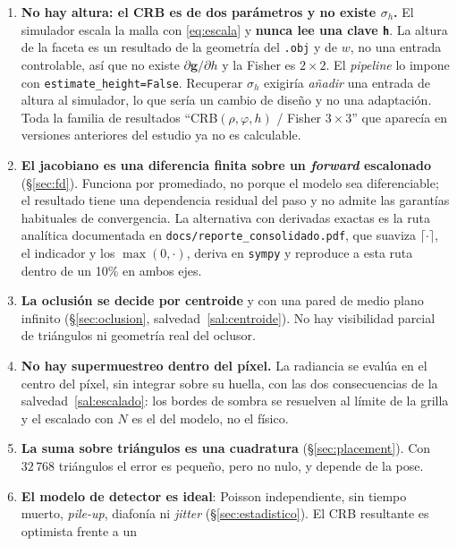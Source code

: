 \documentclass[11pt,a4paper]{article}
\newcommand{\vect}[1]{\boldsymbol{#1}}
\newcommand{\code}[1]{\texttt{#1}}
\theoremstyle{definition}
\theoremstyle{plain}
\begin{document}
\begin{enumerate}[leftmargin=*]
  \item \textbf{No hay altura: el CRB es de dos parámetros y no existe
        $\sigma_h$.} El simulador escala la malla con \eqref{eq:escala} y
        \textbf{nunca lee una clave \code{h}}. La altura de la faceta es un
        resultado de la geometría del \code{.obj} y de $w$, no una entrada
        controlable, así que no existe $\partial\vect g/\partial h$ y la Fisher
        es $2\times2$. El \emph{pipeline} lo impone con
        \code{estimate\_height=False}. Recuperar $\sigma_h$ exigiría
        \emph{añadir} una entrada de altura al simulador, lo que sería un cambio
        de diseño y no una adaptación. Toda la familia de resultados
        \enquote{CRB$(\rho,\varphi,h)$ / Fisher $3\times3$} que aparecía en
        versiones anteriores del estudio ya no es calculable.
  \item \textbf{El jacobiano es una diferencia finita sobre un \emph{forward}
        escalonado} (\S\ref{sec:fd}). Funciona por promediado, no porque el
        modelo sea diferenciable; el resultado tiene una dependencia residual
        del paso y no admite las garantías habituales de convergencia. La
        alternativa con derivadas exactas es la ruta analítica documentada en
        \code{docs/reporte\_consolidado.pdf}, que suaviza $\lceil\cdot\rceil$,
        el indicador y los $\max(0,\cdot)$, deriva en \code{sympy} y reproduce a
        esta ruta dentro de un 10\% en ambos ejes.
  \item \textbf{La oclusión se decide por centroide} y con una pared de medio
        plano infinito (\S\ref{sec:oclusion}, salvedad~\ref{sal:centroide}). No
        hay visibilidad parcial de triángulos ni geometría real del oclusor.
  \item \textbf{No hay supermuestreo dentro del píxel.} La radiancia se evalúa
        en el centro del píxel, sin integrar sobre su huella, con las dos
        consecuencias de la salvedad~\ref{sal:escalado}: los bordes de sombra se
        resuelven al límite de la grilla y el escalado con $N$ es el del modelo,
        no el físico.
  \item \textbf{La suma sobre triángulos es una cuadratura} (\S\ref{sec:placement}).
        Con $32\,768$ triángulos el error es pequeño, pero no nulo, y depende de
        la pose.
  \item \textbf{El modelo de detector es ideal}: Poisson independiente, sin
        tiempo muerto, \emph{pile-up}, diafonía ni \emph{jitter}
        (\S\ref{sec:estadistico}). El CRB resultante es optimista frente a un

\end{enumerate}
\end{document}
